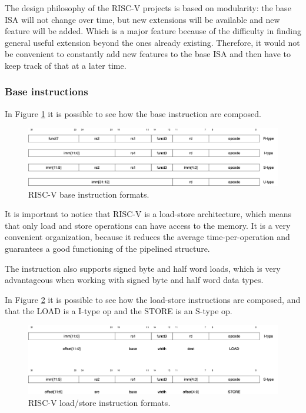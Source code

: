 The design philosophy of the RISC-V projects is based on modularity: the base ISA will not change over time, but new extensions will be available and new feature will be added. Which is a major feature because of the difficulty in finding general useful extension beyond the ones already existing. Therefore, it would not be convenient to constantly add new features to the base ISA and then have to keep track of that at a later time.


\subsubsection{Base instructions}
In Figure \ref{riscv-base-instruction-formats} it is possible to see how the base instruction are composed.

\begin{figure}[H]
    \centering
    \includegraphics[scale = 0.27]{Chapter_1/img/riscv-base-instruction-formats.png}
    \caption{RISC-V base instruction formats. \cite{RISC-V-Instruction-Set-Manual}}
    \label{riscv-base-instruction-formats}
\end{figure}

It is important to notice that RISC-V is a load-store architecture, which means that only load and store operations can have access to the memory.
It is a very convenient organization, because it reduces the average time-per-operation and guarantees a good functioning of the pipelined structure.

The instruction also supports signed byte and half word loads, which is very advantageous when working with signed byte and half word data types.

In Figure \ref{riscv-load-store} it is possible to see how the load-store instructions are composed, and that the LOAD is a I-type op and the STORE is an S-type op.

\begin{figure}[H]
    \centering
    \includegraphics[scale = 0.27]{Chapter_1/img/riscv-load-store.png}
    \caption{RISC-V load/store instruction formats. \cite{RISC-V-Instruction-Set-Manual}}
    \label{riscv-load-store}
\end{figure}


